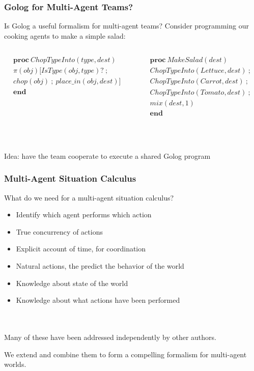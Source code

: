 \documentclass{beamer}
\begin{document}
\begin{frame}
\frametitle{Golog for Multi-Agent Teams?}
Is Golog a useful formalism for multi-agent teams?
Consider programming our cooking agents to make a simple salad:
\ \\
\begin{columns}
  \begin{column}{0.5\textwidth}
\[
\begin{array}{c}
\mathbf{proc}\ ChopTypeInto(type,dest)\\
\pi(obj)[IsType(obj,type)?\ ;\\
chop(obj)\ ;\ place\_in(obj,dest)]\\
\mathbf{end}\end{array}\]
  \end{column}
  \begin{column}{0.5\textwidth}
\[
\begin{array}{c}
\mathbf{proc}\ MakeSalad(dest)\\
ChopTypeInto(Lettuce,dest)\ ;\\
ChopTypeInto(Carrot,dest)\ ;\\
ChopTypeInto(Tomato,dest)\ ;\\
mix(dest,1)\\
\mathbf{end}\end{array}\]
  \end{column}
\end{columns}
\ \\
\ \\
\pause
\alert{Idea}:  have the team cooperate to execute a shared Golog program
\end{frame}

\begin{frame}
\frametitle{Multi-Agent Situation Calculus}
What do we need for a multi-agent situation calculus?
\begin{itemize}
  \item Identify which agent performs which action
  \item True concurrency of actions
  \item Explicit account of time, for coordination
  \item Natural actions, the predict the behavior of the world
  \item Knowledge about state of the world
  \item Knowledge about what actions have been performed
\end{itemize}
\ \\
\ \\
\pause
Many of these have been addressed independently by other authors.

We extend and combine them to form a compelling formalism for multi-agent
worlds.
\end{frame}
\end{document}
